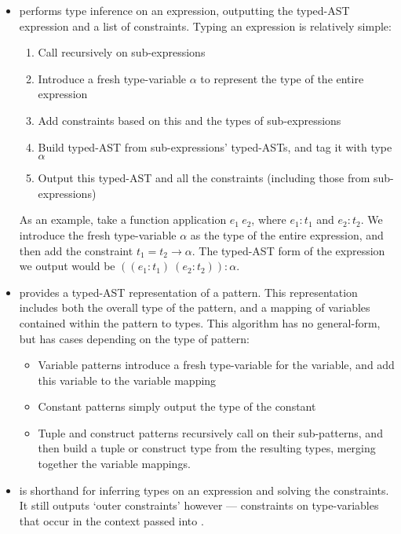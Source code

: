 \begin{itemize}
\item {} performs type inference on an expression, outputting the typed-AST expression and a list of constraints. Typing an expression is relatively simple:
\begin{enumerate}
\item Call  recursively on sub-expressions
\item Introduce a fresh type-variable $\alpha$ to represent the type of the entire expression
\item Add constraints based on this and the types of sub-expressions
\item Build typed-AST from sub-expressions' typed-ASTs, and tag it with type $\alpha$
\item Output this typed-AST and all the constraints (including those from sub-expressions)
\end{enumerate}
As an example, take a function application $e_1\ e_2$, where $e_1 : t_1$ and $e_2 : t_2$. We introduce the fresh type-variable $\alpha$ as the type of the entire expression, and then add the constraint $t_1 = t_2 \rightarrow \alpha$. The typed-AST form of the expression we output would be $((e_1 : t_1)\ (e_2 : t_2)) : \alpha$.

\item {} provides a typed-AST representation of a pattern. This representation includes both the overall type of the pattern, and a mapping of variables contained within the pattern to types. This algorithm has no general-form, but has cases depending on the type of pattern:
\begin{itemize}
\item Variable patterns introduce a fresh type-variable for the variable, and add this variable to the variable mapping
\item Constant patterns simply output the type of the constant
\item Tuple and construct patterns recursively call  on their sub-patterns, and then build a tuple or construct type from the resulting types, merging together the variable mappings.
\end{itemize}

\item {} is shorthand for inferring types on an expression and solving the constraints. It still outputs `outer constraints' however --- constraints on type-variables that occur in the context passed into .


\end{itemize}
